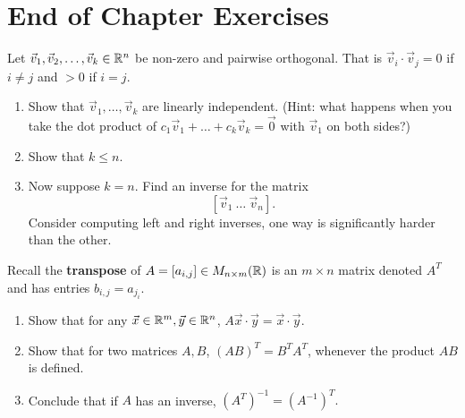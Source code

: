 \section{End of Chapter Exercises}
\begin{exerciselist}
	\item Let $\vec{v}_1,\vec{v}_2,\ldots,\vec{v}_k\in \mathbb{R}^n$ be non-zero and pairwise orthogonal. That is $\vec{v}_i\cdot\vec{v}_{j}=0$ if $i\neq j$ and $>0$ if $i=j$. \begin{enumerate} [label=(\alph*)]
		\item Show that $\vec{v}_1,\ldots,\vec{v}_k$ are linearly independent. (Hint: what happens when you take the dot product of $c_1\vec{v}_1+\ldots+c_k\vec{v}_k=\vec{0}$ with $\vec{v}_1$ on both sides?)
		\item Show that $k\leq n$.
		\item Now suppose $k=n$. Find an inverse for the matrix \[
		[\vec{v}_1 \ \ldots \ \vec{v}_n]. 
		\]
		Consider computing left and right inverses, one way is significantly harder than the other.
	\end{enumerate}
	\item Recall the \textbf{transpose} of $A=[a_{i,j}]\in M_{n\times m}(\mathbb{R})$ is an $m\times n$ matrix denoted $A^T$ and has entries $b_{i,j}=a_{j_i}$. \begin{enumerate}[label=(\alph*)]
		\item Show that for any $\vec{x}\in \mathbb{R}^m, \vec{y}\in \mathbb{R}^n$, $A\vec{x}\cdot \vec{y}=\vec{x}\cdot \vec{y}.$
		\item Show that for two matrices $A,B$,  $(AB)^T=B^T A^T$, whenever the product $AB$ is defined.
		\item Conclude that if $A$ has an inverse, $(A^T)^{-1}=(A^{-1})^T.$
	\end{enumerate}
	

\end{exerciselist}
